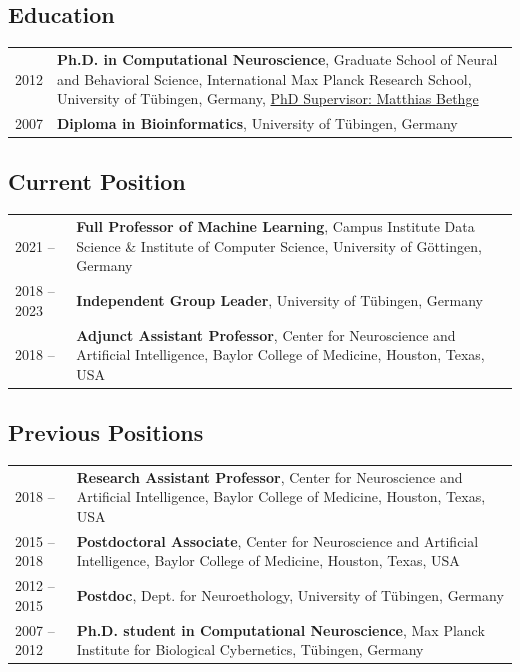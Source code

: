 \documentclass[COG,11pt]{ercgrant}
\begin{document}
\subsection{Education}
\begin{tabular}{p{3cm}p{12cm}}
	2012
	 & \textbf{Ph.D. in Computational Neuroscience}, Graduate School of Neural and Behavioral Science, International Max Planck Research School, University of Tübingen, Germany, \underline{PhD Supervisor: Matthias Bethge}\\
    2007 & \textbf{Diploma in Bioinformatics}, University of Tübingen, Germany
\end{tabular}

\subsection{Current Position}
\begin{tabular}{p{3cm}p{12cm}}
    2021 -- 
	 & \textbf{Full Professor of Machine Learning}, 
       Campus Institute Data Science \& Institute of Computer Science,
       University of Göttingen, Germany\\
    2018 -- 2023
      & \textbf{Independent Group Leader}, 
       University of Tübingen, Germany\\
    2018 -- 
      & \textbf{Adjunct Assistant Professor},
       Center for Neuroscience and Artificial Intelligence,
       Baylor College of Medicine, Houston, Texas, USA
\end{tabular}

\subsection{Previous Positions}
\begin{tabular}{p{3cm}p{12cm}}
    2018 -- 
      & \textbf{Research Assistant Professor},
       Center for Neuroscience and Artificial Intelligence, 
       Baylor College of Medicine, Houston, Texas, USA\\
    2015 -- 2018 
      & \textbf{Postdoctoral Associate},
       Center for Neuroscience and Artificial Intelligence,
       Baylor College of Medicine, Houston, Texas, USA\\
    2012 -- 2015 
      & \textbf{Postdoc},
       Dept. for Neuroethology, 
       University of Tübingen, Germany\\
    2007 -- 2012 
      & \textbf{Ph.D. student in Computational Neuroscience}, Max Planck Institute for Biological Cybernetics, Tübingen, Germany\\
\end{tabular}
\color{black}
\end{document}
